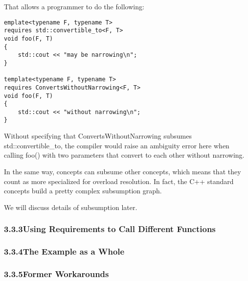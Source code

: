 That allows a programmer to do the following:

\begin{lstlisting}[style=styleCXX]
emplate<typename F, typename T>
requires std::convertible_to<F, T>
void foo(F, T)
{
	std::cout << "may be narrowing\n";
}

template<typename F, typename T>
requires ConvertsWithoutNarrowing<F, T>
void foo(F, T)
{
	std::cout << "without narrowing\n";
}
\end{lstlisting}

Without specifying that ConvertsWithoutNarrowing subsumes std::convertible\_to, the compiler would raise an ambiguity error here when calling foo() with two parameters that convert to each other without narrowing.

In the same way, concepts can subsume other concepts, which means that they count as more specialized for overload resolution. In fact, the C++ standard concepts build a pretty complex subsumption graph.

We will discuss details of subsumption later.

\subsubsection*{ 3.3.3\hspace{0.2cm}Using Requirements to Call Different Functions}



\subsubsection*{ 3.3.4\hspace{0.2cm}The Example as a Whole}



\subsubsection*{ 3.3.5\hspace{0.2cm}Former Workarounds}







